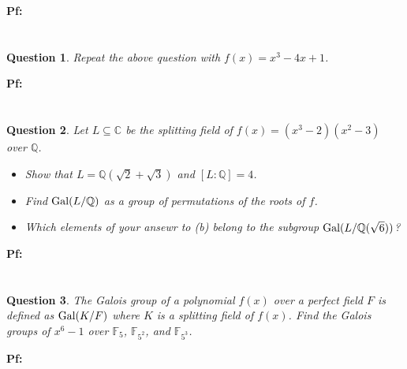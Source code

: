 \documentclass{article}
\newtheorem{question}{Question}
\newcommand{\FF}{\mathbb{F}}
\newcommand{\QQ}{\mathbb{Q}}
\newcommand{\CC}{\mathbb{C}}
\newcommand{\Gal}{\textmd{Gal}}
\begin{document}
\textbf{Pf:}

\break

\section{}
\begin{question}\label{q3}
    Repeat the above question with $f(x)=x^3-4x+1$.
\end{question}

\textbf{Pf:}

\break

\section{}
\begin{question}\label{q4}
    Let $L\subseteq \CC$ be the splitting field of $f(x)=(x^3-2)(x^2-3)$ over $\QQ$.
    \begin{itemize}
        \item[(a)] Show that $L=\QQ(\sqrt{2}+\sqrt{3})$ and $[L:\QQ]=4$.
        \item[(b)] Find $\Gal(L/\QQ)$ as a group of permutations of the roots of $f$.
        \item[(c)] Which elements of your ansewr to (b) belong to the subgroup $\Gal(L/\QQ(\sqrt{6}))$?  
    \end{itemize}
\end{question}

\textbf{Pf:}

\break

\section{}
\begin{question}\label{q5}
    The Galois group of a polynomial $f(x)$ over a perfect field $F$ is defined as $\Gal(K/F)$ where $K$ is a splitting field of $f(x)$. Find the Galois groups of $x^6-1$ over $\FF_5$, $\FF_{5^2}$, and $\FF_{5^3}$.
\end{question}

\textbf{Pf:}
\end{document}
